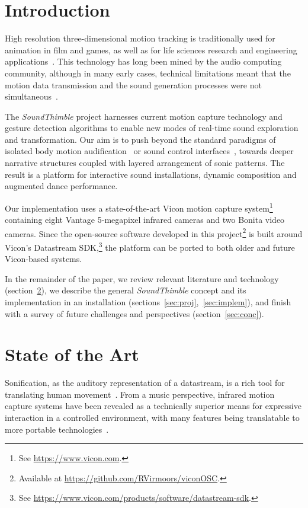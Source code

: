 \section{Introduction}

High resolution three-dimensional motion tracking is traditionally used for animation in film and games, as well as for life sciences research and engineering applications~\cite{welch2002motion}. This technology has long been mined by the audio computing community, although in many early cases, technical limitations meant that the motion data transmission and the sound generation processes were not simultaneous~\cite{dobrian2003gestural, kapur2005framework}.


The \textit{SoundThimble} project harnesses current motion capture technology and gesture detection algorithms to enable new modes of real-time sound exploration and transformation. Our aim is to push beyond the standard paradigms of isolated body motion audification~\cite{dobrian2003gestural,kapur2005framework} or sound control interfaces~\cite{eckel2009motion}, towards deeper narrative structures coupled with layered arrangement of sonic patterns. The result is a platform for interactive sound installations, dynamic composition and augmented dance performance.


Our implementation uses a state-of-the-art Vicon motion capture system\footnote{See  \url{https://www.vicon.com}.} containing eight Vantage 5-megapixel infrared cameras and two Bonita video cameras. Since the open-source software developed in this project\footnote{Available at  \url{https://github.com/RVirmoors/viconOSC}.} is built around Vicon's Datastream SDK,\footnote{See  \url{https://www.vicon.com/products/software/datastream-sdk}.} the platform can be ported to both older and future Vicon-based systems.

In the remainder of the paper, we review relevant literature and technology (section~\ref{sec:related}), we describe the general \textit{SoundThimble} concept and its implementation in an installation (sections~\ref{sec:proj},~\ref{sec:implem}), and finish with a survey of future challenges and perspectives (section~\ref{sec:conc}).

\section{State of the Art}
\label{sec:related}

Sonification, as the auditory representation of a datastream, is a rich tool for translating human movement~\cite{hermann2011sonification}. From a music perspective, infrared motion capture systems have been revealed as a technically superior means for expressive interaction in a controlled environment, with many features being translatable to more portable technologies~\cite{skogstad2010using,vigliensoni2012quantitative}.

